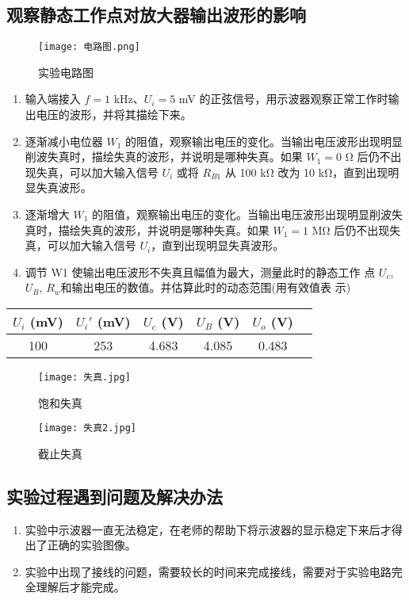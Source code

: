 \documentclass[dvipsnames, svgnames,a4paper,11pt]{article}
\begin{document}
			\subsection{观察静态工作点对放大器输出波形的影响}		
\begin{figure}[{H}]
	\centering
	\texttt{[image: 电路图.png]}
	\caption{实验电路图}
	\label{}
\end{figure}
\begin{enumerate}
    \item 输入端接入 $f = 1$ kHz、$U_i = 5$ mV 的正弦信号，用示波器观察正常工作时输出电压的波形，并将其描绘下来。
    \item 逐渐减小电位器 $W_1$ 的阻值，观察输出电压的变化。当输出电压波形出现明显削波失真时，描绘失真的波形，并说明是哪种失真。如果 $W_1 = 0$ Ω 后仍不出现失真，可以加大输入信号 $U_i$ 或将 $R_{B1}$ 从 100 kΩ 改为 10 kΩ，直到出现明显失真波形。
    \item 逐渐增大 $W_1$ 的阻值，观察输出电压的变化。当输出电压波形出现明显削波失真时，描绘失真的波形，并说明是哪种失真。如果 $W_1 = 1$ MΩ 后仍不出现失真，可以加大输入信号 $U_i$，直到出现明显失真波形。
    \item 调节 W1 使输出电压波形不失真且幅值为最大，测量此时的静态工作
	点 $U_{c}$, $U_{B}$, $R_{w}$和输出电压的数值。并估算此时的动态范围(用有效值表
	示)
\end{enumerate}
\begin{center}
	\begin{tabular}{|c|c|c|c|c|c|}
	\hline
	$U_i$ (mV) & $U_i'$ (mV) & $U_c$ (V) & $U_B$ (V) & $U_o$ (V) \\
	\hline
	100 & 253 & 4.683 & 4.085 & 0.483 \\
	\hline
	\end{tabular}
	\end{center}
	\begin{figure}[{H}]
		\centering
		\texttt{[image: 失真.jpg]}
		\caption{饱和失真}
		\label{}
	\end{figure}
	\begin{figure}[{H}]
		\centering
		\texttt{[image: 失真2.jpg]}
		\caption{截止失真}
		\label{}
	\end{figure}
	


	\clearpage
	
	\subsection{实验过程遇到问题及解决办法}
	\begin{enumerate}
		\item 实验中示波器一直无法稳定，在老师的帮助下将示波器的显示稳定下来后才得出了正确的实验图像。
		\item 实验中出现了接线的问题，需要较长的时间来完成接线，需要对于实验电路完全理解后才能完成。
	\end{enumerate}
	
\end{document}

